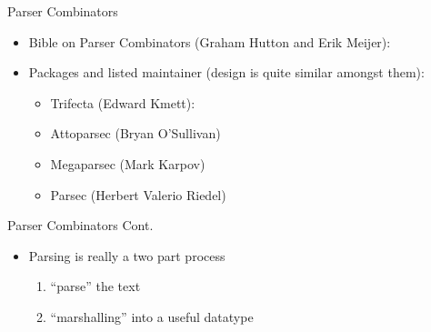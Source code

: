 \documentclass[hyperref={pdfpagelabels=false},12pt]{beamer}
\newcommand{\unnamedUrl}[1]{\href{#1}{\color{blue}{#1}}}
\begin{document}
\begin{frame}{Parser Combinators}
  \begin{itemize}
    \item Bible on Parser Combinators (Graham Hutton and Erik Meijer): \unnamedUrl{http://www.cs.nott.ac.uk/~pszgmh/monparsing.pdf}
    \item Packages and listed maintainer (design is quite similar amongst them):
    \begin{itemize}
      \item Trifecta (Edward Kmett): \unnamedUrl{https://hackage.haskell.org/package/trifecta}
      \item Attoparsec (Bryan O'Sullivan) \unnamedUrl{http://hackage.haskell.org/package/attoparsec}
      \item Megaparsec (Mark Karpov) \unnamedUrl{http://hackage.haskell.org/package/megaparsec}
      \item Parsec (Herbert Valerio Riedel) \unnamedUrl{http://hackage.haskell.org/package/parsec}
    \end{itemize}
  \end{itemize}
\end{frame}

\begin{frame}{Parser Combinators Cont.}
  \begin{itemize}
    \item Parsing is really a two part process
    \begin{enumerate}
      \item ``parse'' the text
      \item ``marshalling'' into a useful datatype
    \end{enumerate}
  \end{itemize}
\end{frame}
\end{document}
